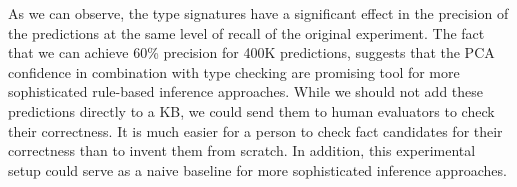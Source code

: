 As we can observe, the type signatures have a significant effect in the precision of the predictions at the same level of recall of
the original experiment. The fact that we can achieve 60\% precision for 400K predictions, suggests that the PCA confidence in combination
with type checking are promising tool for more sophisticated rule-based inference approaches.  
While we should not add these predictions directly to a KB, we could send them to human evaluators to check their correctness.
It is much easier for a person to check fact candidates for their correctness than to invent them from scratch. 
In addition, this experimental setup could serve as a naive baseline for more sophisticated inference approaches.


% 
% 

